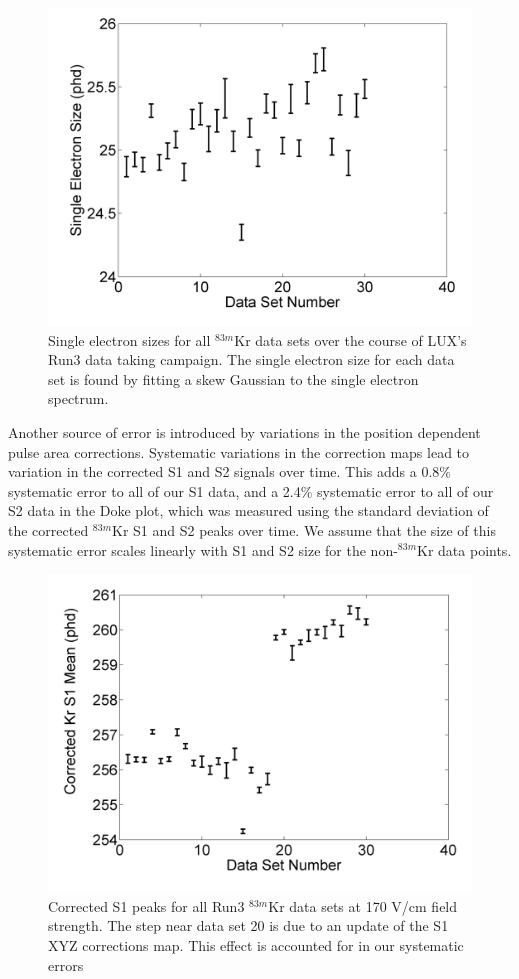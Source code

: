 \begin{figure}[H]
\centering
\includegraphics[scale=0.4]{SESizes.png}
\caption{Single electron sizes for all $^{83m}$Kr data sets over the course of LUX's Run3 data taking campaign.  The single electron size for each data set is found by fitting a skew Gaussian to the single electron spectrum.}
\label{SESizes}
\end{figure}


Another source of error is introduced by variations in the position dependent pulse area corrections.  Systematic variations in the correction maps lead to variation in the corrected S1 and S2 signals over time.  This adds a 0.8\% systematic error to all of our S1 data, and a 2.4\% systematic error to all of our S2 data in the Doke plot, which was measured using the standard deviation of the corrected $^{83m}$Kr S1 and S2 peaks over time.  We assume that the size of this systematic error scales linearly with S1 and S2 size for the non-$^{83m}$Kr data points.

\begin{figure}[H]
\centering
\includegraphics[scale=0.4]{S1Variation.png}
\caption{Corrected S1 peaks for all Run3 $^{83m}$Kr data sets at 170 V/cm field strength.  The step near data set 20 is due to an update of the S1 XYZ corrections map.  This effect is accounted for in our systematic errors}
\label{S1Variation}
\end{figure}


